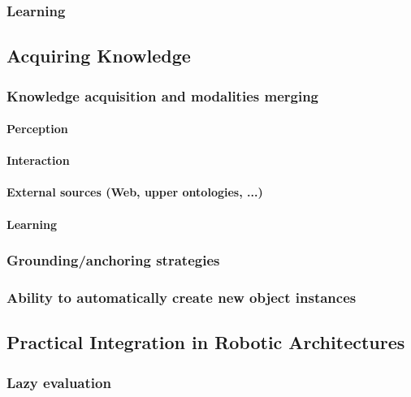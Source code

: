 \documentclass[a4paper, twocolumn]{article}
\begin{document}
\subsubsection{Learning}
\label{sect|learning}

\subsection{Acquiring Knowledge}

\subsubsection{Knowledge acquisition and modalities merging}
\label{sect|knowledge-acquisition}

\paragraph{Perception}
\paragraph{Interaction}
\paragraph{External sources (Web, upper ontologies, ...)}
\paragraph{Learning}

\subsubsection{Grounding/anchoring strategies}
\label{sect|grounding}

\subsubsection{Ability to automatically create new object instances}
\label{sect|new-instances}

\subsection{Practical Integration in Robotic Architectures}
\label{sect|integration-robot}

\subsubsection{Lazy evaluation}
\label{sect|lazy-evaluation}
\end{document}
